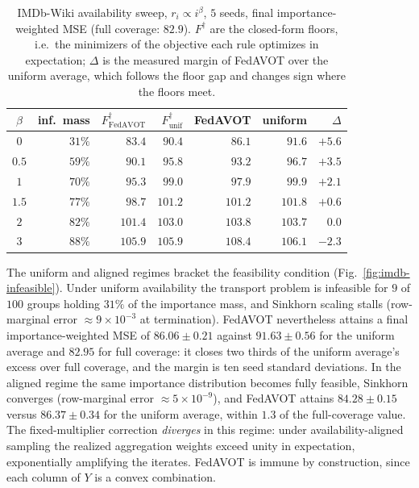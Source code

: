 \documentclass[9pt]{extarticle}
\theoremstyle{definition}
\begin{document}
\begin{table}[t]
  \centering\footnotesize\setlength{\tabcolsep}{3.5pt}
  \caption{IMDb-Wiki availability sweep, $r_i \propto i^{\beta}$, $5$ seeds,
  final importance-weighted MSE (full coverage: $82.9$). $F^{\dagger}$ are the
  closed-form floors, i.e.\ the minimizers of the objective each rule
  optimizes in expectation; $\Delta$ is the measured margin of FedAVOT over
  the uniform average, which follows the floor gap and changes sign where
  the floors meet.}
  \label{tab:sweep}
  \begin{tabular}{crrrrrr}
    \hline
    $\beta$ & inf.\ mass & $F^{\dagger}_{\mathrm{FedAVOT}}$ & $F^{\dagger}_{\mathrm{unif}}$ & FedAVOT & uniform & $\Delta$ \\
    \hline
    $0$   & $31\%$ & $83.4$  & $90.4$  & $86.1$  & $91.6$  & $+5.6$ \\
    $0.5$ & $59\%$ & $90.1$  & $95.8$  & $93.2$  & $96.7$  & $+3.5$ \\
    $1$   & $70\%$ & $95.3$  & $99.0$  & $97.9$  & $99.9$  & $+2.1$ \\
    $1.5$ & $77\%$ & $98.7$  & $101.2$ & $101.2$ & $101.8$ & $+0.6$ \\
    $2$   & $82\%$ & $101.4$ & $103.0$ & $103.8$ & $103.7$ & $0.0$ \\
    $3$   & $88\%$ & $105.9$ & $105.9$ & $108.4$ & $106.1$ & $-2.3$ \\
    \hline
  \end{tabular}
\end{table}
The uniform and aligned regimes bracket the feasibility condition
(Fig.~\ref{fig:imdb-infeasible}). Under
uniform availability the transport problem is infeasible for $9$ of $100$
groups holding $31\%$ of the importance mass, and Sinkhorn scaling stalls
(row-marginal error ${\approx}9\times10^{-3}$ at termination). FedAVOT
nevertheless attains a final importance-weighted MSE of $86.06 \pm 0.21$
against $91.63 \pm 0.56$ for the uniform average and $82.95$ for full
coverage: it closes two thirds of the uniform average's excess over full
coverage, and the margin is ten seed standard deviations. In the aligned regime the same
importance distribution becomes fully feasible, Sinkhorn converges
(row-marginal error ${\approx}5\times10^{-9}$), and FedAVOT attains
$84.28 \pm 0.15$ versus $86.37 \pm 0.34$ for the uniform average, within
$1.3$ of the full-coverage value. The fixed-multiplier correction
\emph{diverges} in this regime: under availability-aligned sampling the
realized aggregation weights exceed unity in expectation, exponentially
amplifying the iterates. FedAVOT is immune by construction, since each
column of $Y$ is a convex combination.
\end{document}
